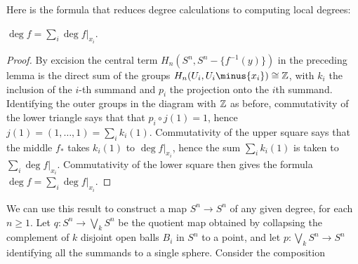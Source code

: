 Here is the formula that reduces degree calculations to computing local
degrees:
\begin{proposition}[2.30]
$\deg f=\sum_i\deg f|_{x_i}$.
\end{proposition}
\begin{proof}
By excision the central term $H_n(S^n,S^n\minus\{f^{-1}(y)\})$ in the
preceding lemma is the direct sum of the groups
$H_n(U_i,U_i\minus\{x_i\})\cong\bbZ$, with $k_i$ the inclusion of the
$i$-th  summand and $p_i$ the projection onto the $i$th
summand. Identifying the outer groups in the diagram with $\mathbb{Z}$ as before,
commutativity of the lower triangle says that that $p_i\circ j(1)=1$, hence
$j(1)=(1,\dotsc,1)=\sum_ik_i(1)$. Commutativity of the upper square says
that the middle $f_*$ takes $k_i(1)$ to $\deg f|_{x_i}$, hence the sum
$\sum_ik_i(1)$ is taken to $\sum_i\deg f|_{x_i}$. Commutativity of the
lower square then gives the formula $\deg f=\sum_i\deg f|_{x_i}$.
\end{proof}
\begin{example}[2.31]
We can use this result to construct a map $S^n\to S^n$ of any given degree,
for each $n\geq 1$. Let $q\colon S^n\to \bigvee_k S^n$ be the quotient map
obtained by collapsing the complement of $k$ disjoint open balls $B_i$ in
$S^n$ to a point, and let $p\colon\bigvee_k S^n\to S^n$ identifying all the
summands to a single sphere. Consider the composition
\end{example}

